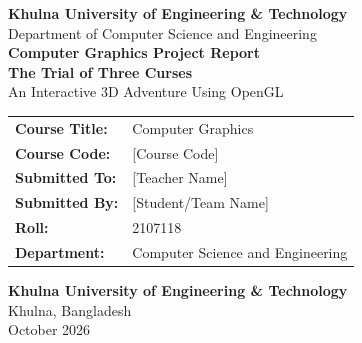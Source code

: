 \documentclass[11pt,a4paper]{article}
\begin{document}

\begin{titlepage}

    \centering

    {\Large\textbf{Khulna University of Engineering \& Technology}}\\[0.25cm]

    {\large Department of Computer Science and Engineering}\\[1.4cm]


    {\Large\textbf{Computer Graphics Project Report}}\\[0.7cm]

    {\Huge\textbf{The Trial of Three Curses}}\\[0.45cm]

    {\large An Interactive 3D Adventure Using OpenGL}\\[1.5cm]

    \begin{tabular}{ll}

        \textbf{Course Title:} & Computer Graphics \\

        \textbf{Course Code:} & [Course Code] \\

        \textbf{Submitted To:} & [Teacher Name] \\

        \textbf{Submitted By:} & [Student/Team Name] \\

        \textbf{Roll:} & 2107118 \\

        \textbf{Department:} & Computer Science and Engineering \\

    \end{tabular}

    \vfill

    {\large\textbf{Khulna University of Engineering \& Technology}}\\

    Khulna, Bangladesh\\[0.25cm]

    October 2026

\end{titlepage}
\end{document}
